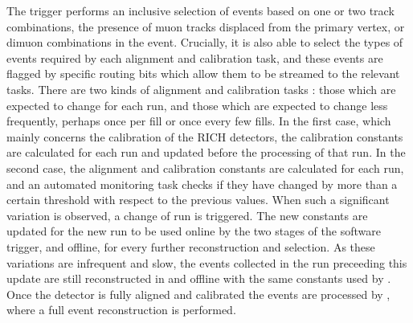 The \hltone trigger performs an inclusive selection of  events based
on one or two track combinations, the presence of muon tracks
displaced from the primary vertex, or dimuon combinations in the
event. Crucially, it is also able to select the types of events
required by each alignment and calibration task, and these events are
flagged by specific routing bits which allow them to be streamed to
the relevant tasks. There are two kinds of alignment and calibration
tasks : those which are expected to change for each run, and those
which are expected to change less frequently, perhaps once per fill or
once every few fills. In the first case, which mainly concerns the
calibration of the RICH detectors, the calibration constants are
calculated for each run and updated before the \hlttwo processing of
that run. In the second case, the alignment and calibration constants
are calculated for each run, and an automated monitoring task checks
if they have changed by more than a certain threshold with respect to
the previous values. When such a significant variation is observed, a
change of run is triggered. The new constants are updated for the new
run to be used online by the two stages of the software trigger, and
offline, for every further reconstruction and selection. As these
variations are infrequent and slow, the events collected in the run
preceeding this update are still reconstructed in \hlttwo and offline
with the same constants used by \hltone.  Once the detector is fully
aligned and calibrated the events are processed by \hlttwo, where a
full event reconstruction is performed. 


